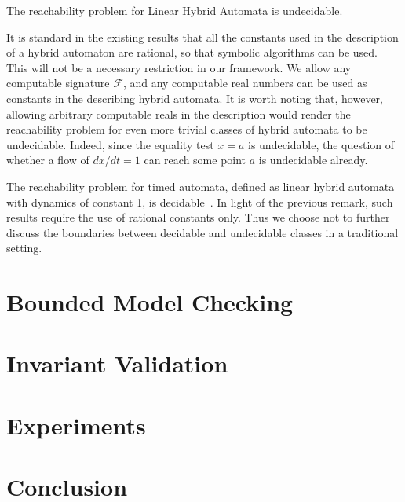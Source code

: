 \documentclass[envcountsect]{llncs}
\begin{document}
\begin{proposition}
The reachability problem for Linear Hybrid Automata is undecidable. 
\end{proposition}

It is standard in the existing results that all the constants used in the description of a hybrid automaton are rational, so that symbolic algorithms can be used. This will not be a necessary restriction in our framework. We allow any computable signature $\mathcal{F}$, and any computable real numbers can be used as constants in the describing hybrid automata. It is worth noting that, however, allowing arbitrary computable reals in the description would render the reachability problem for even more trivial classes of hybrid automata to be undecidable. Indeed, since the equality test $x=a$ is undecidable, the question of whether a flow of $dx/dt = 1$ can reach some point $a$ is undecidable already.

\begin{remark}
The reachability problem for timed automata, defined as linear hybrid automata with dynamics of constant 1, is decidable~\cite{DBLP:conf/rex/AlurD91}. In light of the previous remark, such results require the use of rational constants only. Thus we choose not to further discuss the boundaries between decidable and undecidable classes in a traditional setting. 
\end{remark}

\section{Bounded Model Checking}

\section{Invariant Validation}

\section{Experiments}

\section{Conclusion}







\end{document}

